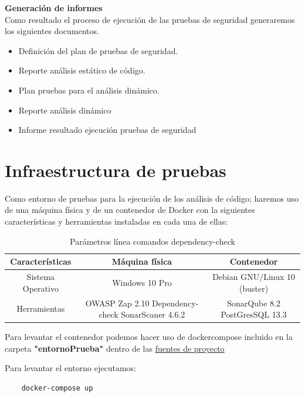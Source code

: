 \textbf{Generación de informes}\\
Como resultado el proceso de ejecución de las pruebas de seguridad generaremos los siguientes documentos.

\begin{itemize}
    \item Definición del plan de pruebas de seguridad.
    \item Reporte análisis estático de código.
    \item Plan pruebas para el análisis dinámico.
    \item Reporte análisis dinámico
    \item Informe resultado ejecución pruebas de seguridad
\end{itemize}

\newpage
\section{Infraestructura de pruebas} 
Como entorno de pruebas para la ejecución de los análisis de código; haremos uso de una máquina física y de un contenedor 
de Docker con la siguientes características y herramientas instaladas en cada una de ellas:

\begin{table}[h!]
    \begin{center}
      \caption{Parámetros línea comandos dependency-check}
      \label{tab:Infraestructura de pruebas}
      \begin{tabular}{c|c|c}
        \textbf{Características} & \textbf{Máquina física} & \textbf{Contenedor}\\
        \hline
        Sistema Operativo & Windows 10 Pro & Debian GNU/Linux 10 (buster)\\ 
        Herramientas & OWASP Zap 2.10
        Dependency-check
        SonarScaner 4.6.2
         & SonarQube 8.2
         PostGresSQL 13.3 \\ 
      \end{tabular}
    \end{center}
  \end{table}

Para levantar el contenedor podemos hacer uso de dockercompose incluido en la carpeta \textbf{"entornoPrueba"} dentro de 
las \href{https://github.com/M0l1n3ta/PFG/tree/master}{fuentes de proyecto}

Para levantar el entorno ejecutamos:
\begin{verbatim}
    docker-compose up
\end{verbatim}

